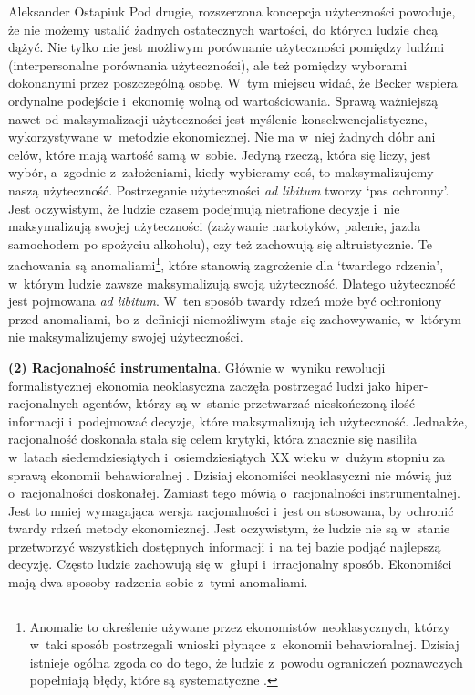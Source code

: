 \begin{artplenv}{Aleksander Ostapiuk}
Pod drugie, rozszerzona koncepcja użyteczności powoduje, że nie możemy ustalić żadnych ostatecznych wartości, do których
ludzie chcą dążyć. Nie tylko nie jest możliwym porównanie użyteczności pomiędzy ludźmi (interpersonalne
porównania użyteczności), ale też pomiędzy wyborami dokonanymi przez poszczególną osobę. W~tym miejscu widać, że Becker
wspiera ordynalne podejście i~ekonomię wolną od wartościowania. Sprawą ważniejszą nawet od maksymalizacji użyteczności
jest myślenie konsekwencjalistyczne, wykorzystywane w~metodzie ekonomicznej. Nie ma w~niej żadnych dóbr ani celów, które
mają wartość samą w~sobie. Jedyną rzeczą, która się liczy, jest wybór, a~zgodnie z~założeniami, kiedy wybieramy coś, to
maksymalizujemy naszą użyteczność. Postrzeganie użyteczności \textit{ad libitum }tworzy `pas ochronny'. Jest
oczywistym, że ludzie czasem podejmują nietrafione decyzje i~nie maksymalizują swojej użyteczności (zażywanie
narkotyków, palenie, jazda samochodem po spożyciu alkoholu), czy też zachowują się altruistycznie. Te zachowania są
anomaliami\footnote{Anomalie to określenie używane przez ekonomistów neoklasycznych, którzy w~taki sposób postrzegali
wnioski płynące z~ekonomii behawioralnej. Dzisiaj istnieje ogólna zgoda co do tego, że ludzie z~powodu ograniczeń
poznawczych popełniają błędy, które są systematyczne
\parencite{thaler_misbehaving:_2015}.
}, które stanowią
zagrożenie dla `twardego rdzenia', w~którym ludzie zawsze maksymalizują swoją użyteczność. Dlatego użyteczność jest
pojmowana \textit{ad libitum}. W~ten sposób twardy rdzeń może być ochroniony przed anomaliami, bo z~definicji
niemożliwym staje się zachowywanie, w~którym nie maksymalizujemy swojej użyteczności. 

\textbf{(2) Racjonalność instrumentalna}. Głównie w~wyniku rewolucji formalistycznej ekonomia
neoklasyczna zaczęła postrzegać ludzi jako hiper-racjonalnych agentów, którzy są w~stanie przetwarzać nieskończoną
ilość informacji i~podejmować decyzje, które maksymalizują ich użyteczność. Jednakże, racjonalność doskonała
stała się celem krytyki, która znacznie się nasiliła w~latach siedemdziesiątych i~osiemdziesiątych XX wieku w~dużym
stopniu za sprawą ekonomii behawioralnej
\parencite{thaler_misbehaving:_2015}.
Dzisiaj ekonomiści neoklasyczni nie
mówią już o~racjonalności doskonałej. Zamiast tego mówią o~racjonalności instrumentalnej. Jest to mniej wymagająca
wersja racjonalności i~jest on stosowana, by ochronić twardy rdzeń metody ekonomicznej. Jest oczywistym, że ludzie nie
są w~stanie przetworzyć wszystkich dostępnych informacji i~na tej bazie podjąć najlepszą decyzję. Często ludzie
zachowują się w~głupi i~irracjonalny sposób. Ekonomiści mają dwa sposoby radzenia sobie z~tymi anomaliami.


\end{artplenv}
